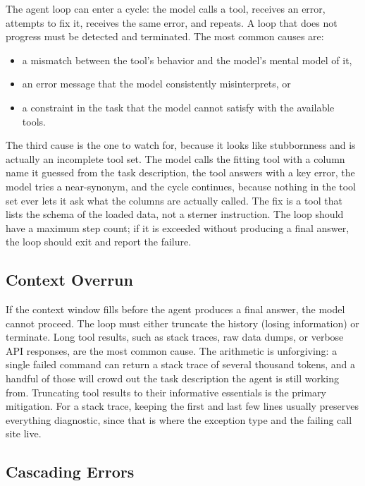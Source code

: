 The agent loop can enter a cycle: the model calls a tool, receives an error, attempts to fix it, receives the same error, and repeats.
A loop that does not progress must be detected and terminated.
The most common causes are:
\begin{itemize}
\item a mismatch between the tool's behavior and the model's mental model of it,
\item an error message that the model consistently misinterprets, or
\item a constraint in the task that the model cannot satisfy with the available tools.
\end{itemize}
The third cause is the one to watch for, because it looks like stubbornness and is actually an incomplete tool set.
The model calls the fitting tool with a column name it guessed from the task description, the tool answers with a key error, the model tries a near-synonym, and the cycle continues, because nothing in the tool set ever lets it ask what the columns are actually called.
The fix is a tool that lists the schema of the loaded data, not a sterner instruction.
The loop should have a maximum step count; if it is exceeded without producing a final answer, the loop should exit and report the failure.

\subsection{Context Overrun}

If the context window fills before the agent produces a final answer, the model cannot proceed.
The loop must either truncate the history (losing information) or terminate.
Long tool results, such as stack traces, raw data dumps, or verbose API responses, are the most common cause.
The arithmetic is unforgiving: a single failed command can return a stack trace of several thousand tokens, and a handful of those will crowd out the task description the agent is still working from.
Truncating tool results to their informative essentials is the primary mitigation.
For a stack trace, keeping the first and last few lines usually preserves everything diagnostic, since that is where the exception type and the failing call site live.

\subsection{Cascading Errors}

